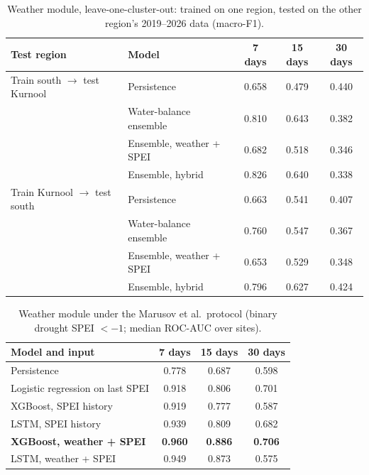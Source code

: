 \documentclass[11pt,a4paper,oneside]{article}
\newcommand{\mf}{macro-F1}
\begin{document}
\begin{table}[H]
\centering
\caption{Weather module, leave-one-cluster-out: trained on one region, tested on the other region's 2019--2026 data (\mf).}
\label{tab:w_loco}
\footnotesize
\begin{tabular}{@{}llccc@{}}
\toprule
\textbf{Test region} & \textbf{Model} & \textbf{7 days} & \textbf{15 days} & \textbf{30 days} \\
\midrule
Train south $\rightarrow$ test Kurnool & Persistence & 0.658 & 0.479 & 0.440 \\
 & Water-balance ensemble & 0.810 & 0.643 & 0.382 \\
 & Ensemble, weather + SPEI & 0.682 & 0.518 & 0.346 \\
 & Ensemble, hybrid & 0.826 & 0.640 & 0.338 \\
\midrule
Train Kurnool $\rightarrow$ test south & Persistence & 0.663 & 0.541 & 0.407 \\
 & Water-balance ensemble & 0.760 & 0.547 & 0.367 \\
 & Ensemble, weather + SPEI & 0.653 & 0.529 & 0.348 \\
 & Ensemble, hybrid & 0.796 & 0.627 & 0.424 \\
\bottomrule
\end{tabular}
\end{table}

\begin{table}[H]
\centering
\caption{Weather module under the Marusov et al.\ protocol (binary drought SPEI $< -1$; median ROC-AUC over sites).}
\label{tab:w_marusov}
\footnotesize
\begin{tabular}{@{}lccc@{}}
\toprule
\textbf{Model and input} & \textbf{7 days} & \textbf{15 days} & \textbf{30 days} \\
\midrule
Persistence & 0.778 & 0.687 & 0.598 \\
Logistic regression on last SPEI & 0.918 & 0.806 & 0.701 \\
XGBoost, SPEI history & 0.919 & 0.777 & 0.587 \\
LSTM, SPEI history & 0.939 & 0.809 & 0.682 \\
\textbf{XGBoost, weather + SPEI} & \textbf{0.960} & \textbf{0.886} & \textbf{0.706} \\
LSTM, weather + SPEI & 0.949 & 0.873 & 0.575 \\
\bottomrule
\end{tabular}
\end{table}
\end{document}
